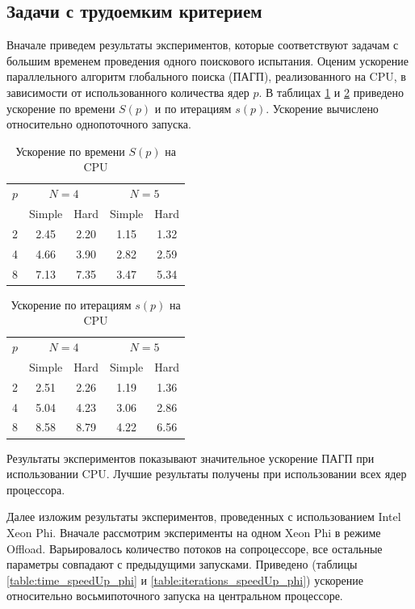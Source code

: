 \documentclass[a4paper]{article}
\begin{document}
\subsection{Задачи с трудоемким критерием}
Вначале приведем результаты экспериментов, которые соответствуют задачам с большим временем проведения одного поискового испытания. Оценим ускорение параллельного алгоритм глобального поиска (ПАГП), реализованного на CPU, в зависимости от использованного количества ядер \(p\). В таблицах \ref{table:time_speedUp_cpu} и \ref{table:iterations_speedUp_cpu} приведено ускорение по времени \(S(p)\) и по итерациям \(s(p)\). Ускорение вычислено относительно однопоточного запуска.
\begin{table}
    \centering
    \begin{tabular}{|c|c|c|c|c|}
    \hline
    \(p\) & \multicolumn{2}{|c|}{\(N=4\)} & \multicolumn{2}{|c|}{\(N=5\)}\\ \cline{2-5}
    & Simple & Hard & Simple & Hard \\ \hline
    2 & 2.45 & 2.20 & 1.15 & 1.32\\ \hline
	4 & 4.66 & 3.90 & 2.82 & 2.59\\ \hline
	8 & 7.13 & 7.35 & 3.47 & 5.34\\ \hline
    \end{tabular}
    \caption{Ускорение по времени \(S(p)\) на CPU}
    \label{table:time_speedUp_cpu}
\end{table}
\begin{table}
    \centering
    \begin{tabular}{|c|c|c|c|c|}
    \hline
    \(p\) & \multicolumn{2}{|c|}{\(N=4\)} & \multicolumn{2}{|c|}{\(N=5\)}\\ \cline{2-5}
    & Simple & Hard & Simple & Hard \\ \hline
	2 & 2.51 & 2.26 & 1.19 & 1.36\\ \hline
	4 & 5.04 & 4.23 & 3.06 & 2.86\\ \hline
	8 & 8.58 & 8.79 & 4.22 & 6.56\\ \hline
    \end{tabular}
    \caption{Ускорение по итерациям \(s(p)\) на CPU}
    \label{table:iterations_speedUp_cpu}
\end{table}
\par
Результаты экспериментов показывают значительное ускорение ПАГП при использовании CPU. Лучшие результаты получены при использовании всех ядер процессора.
\par
Далее изложим результаты экспериментов, проведенных с использованием Intel Xeon Phi. Вначале рассмотрим эксперименты на одном Xeon Phi в режиме Offload. Варьировалось количество потоков на сопроцессоре, все остальные параметры совпадают с предыдущими запусками. Приведено (таблицы \ref{table:time_speedUp_phi} и \ref{table:iterations_speedUp_phi}) ускорение относительно восьмипоточного запуска на центральном процессоре.
\end{document}
